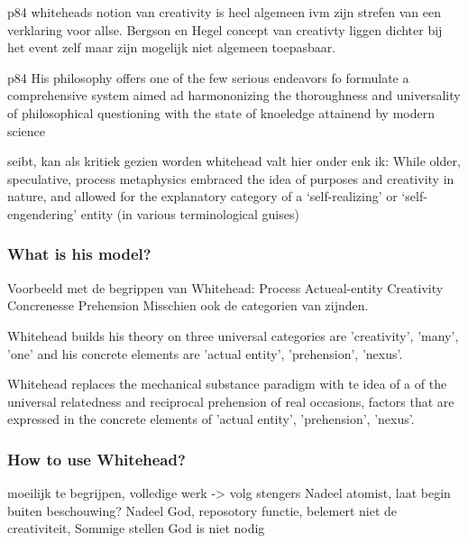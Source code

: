 {p84 
whiteheads notion van creativity is heel algemeen ivm zijn strefen van een verklaring voor allse. Bergson en Hegel concept van creativty liggen dichter bij het event zelf maar zijn mogelijk niet algemeen toepasbaar.

p84
His philosophy offers one of the few serious endeavors fo formulate a comprehensive  system aimed ad harmononizing the thoroughness and universality of philosophical questioning with the state of knoeledge attainend by modern science \cite[p84]{rapp1990whitehead}

seibt, kan als kritiek gezien worden whitehead valt hier onder enk ik:
While older, speculative, process metaphysics embraced the idea of purposes and creativity in nature, and allowed for the explanatory category of a ‘self-realizing’ or ‘self-engendering’ entity (in various terminological guises)
\subsubsection{What is his model?}

Voorbeeld met de begrippen van Whitehead:
Process
Actueal-entity
Creativity
Concrenesse
Prehension
Misschien ook de categorien van zijnden.

\cite{whitehead1929process}
Whitehead builds his theory on three universal categories are 'creativity', 'many', 'one' and his concrete elements are 'actual entity', 'prehension', 'nexus'.


Whitehead replaces the mechanical substance paradigm with te idea of a of 
the universal relatedness and reciprocal prehension of real occasions, factors that are expressed in the concrete elements of 'actual entity', 'prehension', 'nexus'.






\subsubsection{How to use Whitehead?}
moeilijk te begrijpen, volledige werk -> volg stengers
Nadeel atomist, laat begin buiten beschouwing?
Nadeel God, reposotory functie, belemert niet de creativiteit, Sommige stellen God is niet nodig
}
